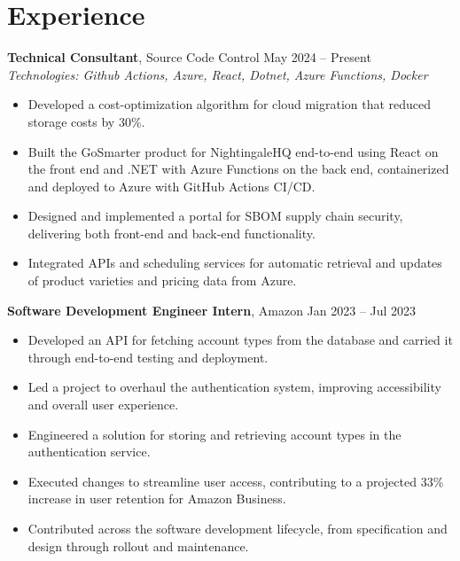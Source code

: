 \documentclass[11pt,a4paper]{article}
\begin{document}
\section{Experience}
\textbf{Technical Consultant}, Source Code Control \hfill May 2024 -- Present
\\ \textit{Technologies: Github Actions, Azure, React, Dotnet, Azure Functions, Docker}
\begin{itemize}
  \item Developed a cost-optimization algorithm for cloud migration that reduced storage costs by 30\%.
  \item Built the GoSmarter product for NightingaleHQ end-to-end using React on the front end and .NET with Azure Functions on the back end, containerized and deployed to Azure with GitHub Actions CI/CD.
  \item Designed and implemented a portal for SBOM supply chain security, delivering both front-end and back-end functionality.
  \item Integrated APIs and scheduling services for automatic retrieval and updates of product varieties and pricing data from Azure.
\end{itemize}
\vspace{2pt}
\textbf{Software Development Engineer Intern}, Amazon \hfill Jan 2023 -- Jul 2023
\begin{itemize}
  \item Developed an API for fetching account types from the database and carried it through end-to-end testing and deployment.
  \item Led a project to overhaul the authentication system, improving accessibility and overall user experience.
  \item Engineered a solution for storing and retrieving account types in the authentication service.
  \item Executed changes to streamline user access, contributing to a projected 33\% increase in user retention for Amazon Business.
  \item Contributed across the software development lifecycle, from specification and design through rollout and maintenance.
\end{itemize}
\vspace{2pt}
\end{document}
